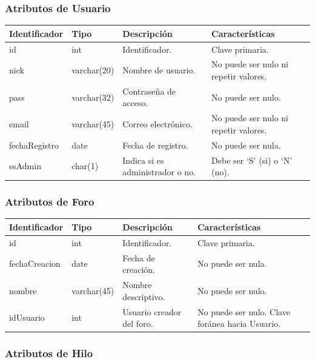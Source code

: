 \documentclass[12pt, a4paper, titlepage]{article}
\begin{document}
\subsubsection{Atributos de Usuario}

\begin{tabular}{|p{3cm}|p{2cm}|p{4cm}|p{4cm}|}
	\hline
	\textbf{Identificador} & \textbf{Tipo} & \textbf{Descripción} & \textbf{Características} \\ \hline
	id & int & Identificador. & Clave primaria. \\ \hline
	nick & varchar(20) & Nombre de usuario. & No puede ser nulo ni repetir valores. \\ \hline
	pass & varchar(32) & Contraseña de acceso. & No puede ser nulo. \\ \hline
	email & varchar(45) & Correo electrónico. & No puede ser nulo ni repetir valores. \\ \hline
	fechaRegistro & date & Fecha de registro. & No puede ser nula. \\ \hline
	esAdmin & char(1) & Indica si es administrador o no. & Debe ser `S' (si) o `N' (no). \\ \hline
\end{tabular}

\subsubsection{Atributos de Foro}

\begin{tabular}{|p{3cm}|p{2cm}|p{4cm}|p{4cm}|}
	\hline
	\textbf{Identificador} & \textbf{Tipo} & \textbf{Descripción} & \textbf{Características} \\ \hline
	id & int & Identificador. & Clave primaria. \\ 
	\hline
	fechaCreacion & date & Fecha de creación. & No puede ser nula. \\ \hline
	nombre & varchar(45) & Nombre descriptivo. & No puede ser nulo. \\ \hline
	idUsuario & int & Usuario creador del foro. & No puede ser nulo. Clave foránea hacia Usuario. \\ \hline
\end{tabular}

\subsubsection{Atributos de Hilo}
\end{document}
